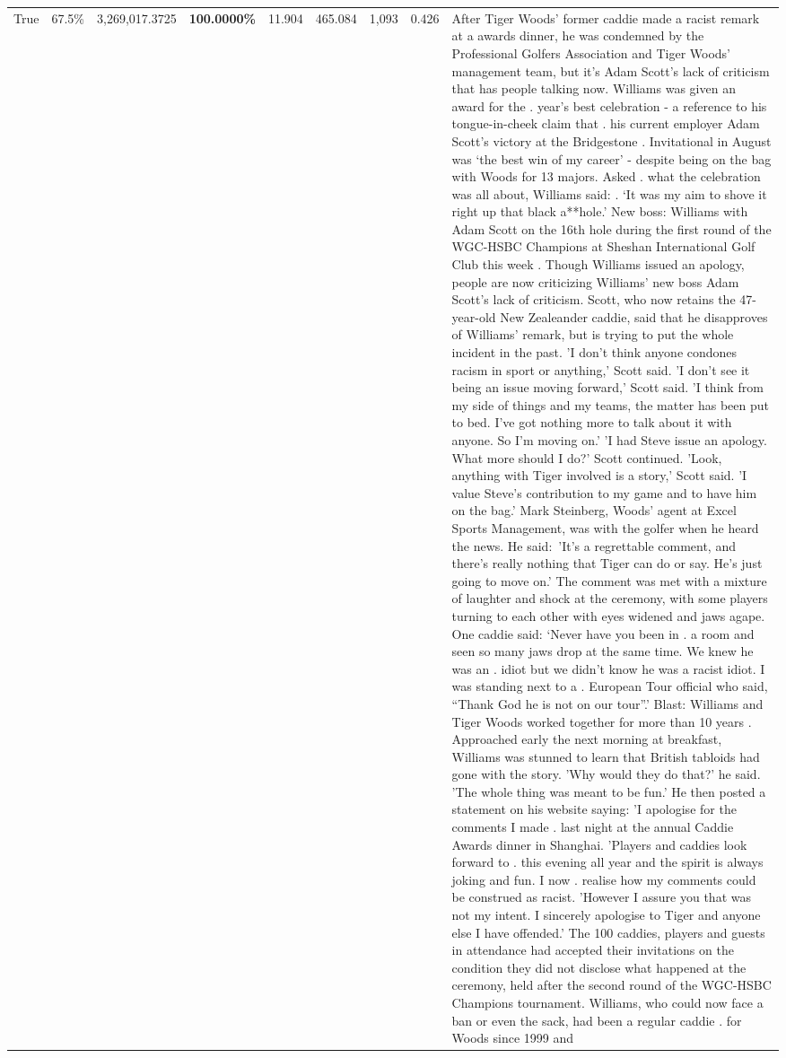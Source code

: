 \begin{table}[H]
\begin{tabular}{lllrlllll}
True & 67.5\% & 3,269,017.3725 & \bfseries \color{red} 100.0000\% & 11.904 & 465.084 & 1,093 & 0.426 & After Tiger Woods' former caddie made a racist remark at a awards dinner, he was condemned by the Professional Golfers Association and Tiger Woods' management team, but it's Adam Scott's lack of criticism that has people talking now. Williams was given an award for the . year’s best celebration - a reference to his tongue-in-cheek claim that . his current employer Adam Scott’s victory at the Bridgestone . Invitational in August was ‘the best win of my career’ - despite being on the bag with Woods for 13 majors. Asked . what the celebration was all about, Williams said: . ‘It was my aim to shove it right up that black a**hole.’ New boss: Williams with Adam Scott  on the 16th hole during the first round of the WGC-HSBC Champions at Sheshan International Golf Club this week . Though Williams issued an apology, people are now criticizing Williams' new boss Adam Scott's lack of criticism. Scott, who now retains the 47-year-old New Zealeander caddie, said that he disapproves of Williams' remark, but is trying to put the whole incident in the past. 'I don't think anyone condones racism in sport or anything,' Scott said. 'I don't see it being an issue moving forward,' Scott said. 'I think from my side of things and my teams, the matter has been put to bed. I've got nothing more to talk about it with anyone. So I'm moving on.' 'I had Steve issue an apology. What more should I do?' Scott continued. 'Look, anything with Tiger involved is a story,' Scott said. 'I value Steve's contribution to my game and to have him on the bag.' Mark Steinberg, Woods' agent at Excel Sports Management, was with the golfer when he heard the news. He said: 'It's a regrettable comment, and there's really nothing that Tiger can do or say. He's just going to move on.' The comment was met with a mixture of laughter and shock at the ceremony, with some players turning to each other with eyes widened and jaws agape. One caddie said: ‘Never have you been in . a room and seen so many jaws drop at the same time. We knew he was an . idiot but we didn’t know he was a racist idiot. I was standing next to a . European Tour official who said, “Thank God he is not on our tour”.’ Blast: Williams and Tiger Woods worked together for more than 10 years . Approached early the next morning at breakfast, Williams was stunned to learn that British tabloids had gone with the story. 'Why would they do that?' he said. 'The whole thing was meant to be fun.' He then posted a statement on his website saying: 'I apologise for the comments I made . last night at the annual Caddie Awards dinner in Shanghai. 'Players and caddies look forward to . this evening all year and the spirit is always joking and fun. I now . realise how my comments could be construed as racist. 'However I assure you that was not my intent. I sincerely apologise to Tiger and anyone else I have offended.' The 100 caddies, players and guests in attendance had accepted their invitations on the condition they did not disclose what happened at the ceremony, held after the second round of the WGC-HSBC Champions tournament. Williams, who could now face a ban or even the sack, had been a regular caddie . for Woods since 1999 and 
\end{tabular}
\end{table}
